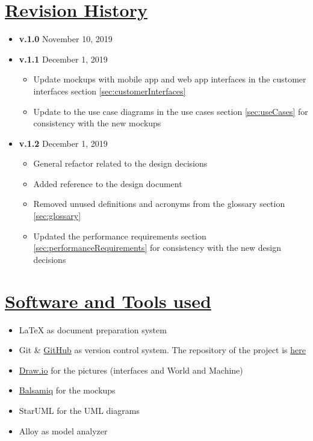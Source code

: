 \begin{appendices}
	\section[Revision History]{\hyperlink{toc}{Revision History}}
		\label{sec:revisionHistory}
		
		\begin{itemize}
			\item \textbf{v.1.0} November 10, 2019
			\item \textbf{v.1.1} December 1, 2019
				\begin{itemize}
					\item Update mockups with mobile app and web app interfaces in the customer interfaces section \ref{sec:customerInterfaces}
					\item Update to the use case diagrams in the use cases section \ref{sec:useCases} for consistency with the new mockups
				\end{itemize}
			\item \textbf{v.1.2} December 1, 2019
				\begin{itemize}
					\item General refactor related to the design decisions
					\item Added reference to the design document \cite{DD}
					\item Removed unused definitions and acronyms from the glossary section \ref{sec:glossary}
					\item Updated the performance requirements section \ref{sec:performanceRequirements} for consistency with the new design decisions
				\end{itemize}
		\end{itemize}
	
	\section[Software and Tools used]{\hyperlink{toc}{Software and Tools used}}
		\label{sec:softwareAndTools}
		
		\begin{itemize}
			\item \LaTeX{} as document preparation system
			\item Git \& \href{https://github.com/}{GitHub} as version control system. The repository of the project is \href{https://github.com/Megapiro/PaccianiPiro}{here}
			\item \href{https://www.draw.io/}{Draw.io} for the pictures (interfaces and World and Machine)
			\item \href{https://balsamiq.com/}{Balsamiq} for the mockups
			\item StarUML for the UML diagrams
			\item Alloy as model analyzer
		\end{itemize}
	
\end{appendices}